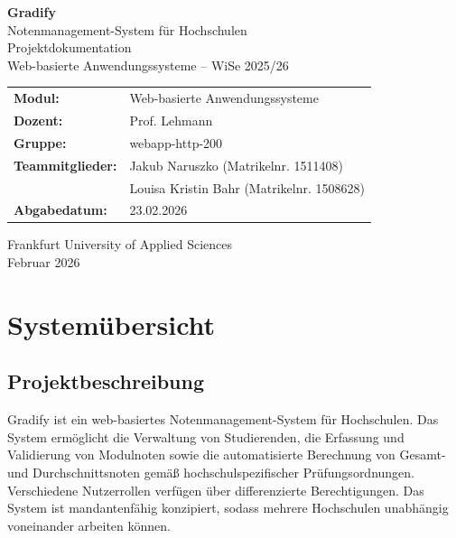 \documentclass[12pt,a4paper,ngerman]{article}
\begin{document}
\begin{titlepage}
\centering
\vspace*{2cm}

{\Huge\bfseries\color{sectioncolor} Gradify}\\[0.5cm]
{\LARGE Notenmanagement-System für Hochschulen}\\[2cm]

{\Large Projektdokumentation}\\[0.5cm]
{\large Web-basierte Anwendungssysteme -- WiSe 2025/26}\\[2cm]

\begin{tabular}{ll}
\textbf{Modul:}       & Web-basierte Anwendungssysteme \\
\textbf{Dozent:}      & Prof. Lehmann \\
\textbf{Gruppe:}      & webapp-http-200 \\[0.3cm]
\textbf{Teammitglieder:} & Jakub Naruszko (Matrikelnr. 1511408) \\
                          & Louisa Kristin Bahr (Matrikelnr. 1508628) \\[0.3cm]
\textbf{Abgabedatum:} & 23.02.2026 \\
\end{tabular}

\vfill

{\large Frankfurt University of Applied Sciences}\\[0.3cm]
{\normalsize Februar 2026}
\end{titlepage}

\newpage
\tableofcontents
\newpage

\section{Systemübersicht}

\subsection{Projektbeschreibung}

Gradify ist ein web-basiertes Notenmanagement-System für Hochschulen. Das System ermöglicht die Verwaltung von Studierenden, die Erfassung und Validierung von Modulnoten sowie die automatisierte Berechnung von Gesamt- und Durchschnittsnoten gemäß hochschulspezifischer Prüfungsordnungen. Verschiedene Nutzerrollen verfügen über differenzierte Berechtigungen. Das System ist mandantenfähig konzipiert, sodass mehrere Hochschulen unabhängig voneinander arbeiten können.
\end{document}
